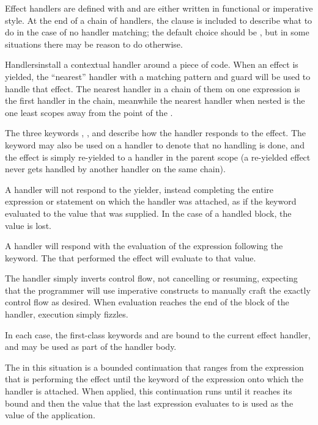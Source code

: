 Effect handlers are defined with  and are either written in functional
or imperative style. At the end of a chain of handlers, the  clause is
included to describe what to do in the case of no handler matching; the default
choice should be , but in some situations there may be reason to
do otherwise.

Handlersinstall a contextual handler around a piece of code. When an effect is
yielded, the ``nearest'' handler with a matching pattern and guard will be used
to handle that effect. The nearest handler in a chain of them on one expression
is the first handler in the chain, meanwhile the nearest handler when nested is
the one least scopes away from the point of the .

The three keywords , , and  describe how the
handler responds to the effect. The  keyword may also be used on a
handler to denote that no handling is done, and the effect is simply re-yielded
to a handler in the parent scope (a re-yielded effect never gets handled by another
handler on the same chain).

A  handler will not respond to the yielder, instead completing the entire expression
or statement on which the handler was attached, as if the  keyword evaluated
to the value that  was supplied. In the case of a handled block, the value
is lost.

A  handler will respond with the evaluation of the expression following
the keyword. The  that performed the effect will evaluate to that value.

The  handler simply inverts control flow, not cancelling or resuming, expecting
that the programmer will use imperative constructs to manually craft the exactly control
flow as desired. When evaluation reaches the end of the block of the  handler,
execution simply fizzles.

In each case, the first-class keywords  and  are bound to the
current effect handler, and may be used as part of the handler body.

The  in this situation is a bounded continuation that ranges from the
 expression that is performing the effect until the  keyword
of the expression onto which the handler is attached. When applied, this continuation
runs until it reaches its bound and then the value that the last expression evaluates
to is used as the value of the  application.


